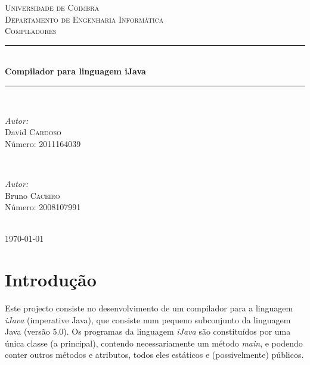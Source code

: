 \documentclass[12pt]{article}
\begin{document}
\renewcommand*\contentsname{Índice}






\begin{titlepage}

\newcommand{\HRule}{\rule{\linewidth}{0.5mm}} 
\center 
 

\textsc{\LARGE Universidade de Coimbra}\\[1.5cm] %
\textsc{\Large Departamento de Engenharia Informática}\\[4cm] %
\textsc{\large Compiladores}\\[1cm] %


\HRule \\[0.5cm]
{ \huge \bfseries Compilador para linguagem iJava}\\[0.4cm] 
\HRule \\[8cm]
 
\begin{minipage}{0.4\textwidth}
\begin{flushleft} \large
\emph{Autor:}\\
David \textsc{Cardoso}  \\Número: 2011164039
\end{flushleft}
\end{minipage}
~
\begin{minipage}{0.4\textwidth}
\begin{flushright} \large
\emph{Autor:} \\
Bruno \textsc{Caceiro}  \\Número: 2008107991
\end{flushright}
\end{minipage}\\[2cm]

{\large \today}\\[3cm]

\vfill

\end{titlepage}


\tableofcontents

\vfill
\pagebreak


\section{Introdução}
Este projecto consiste no desenvolvimento de um compilador para a linguagem \emph{iJava} (imperative Java), que consiste num pequeno subconjunto da linguagem Java (versão 5.0). Os programas da linguagem \emph{iJava} são constituídos por uma única classe (a principal), contendo necessariamente um método \emph{main}, e podendo conter outros métodos e atributos, todos eles estáticos e (possivelmente) públicos.
\end{document}
